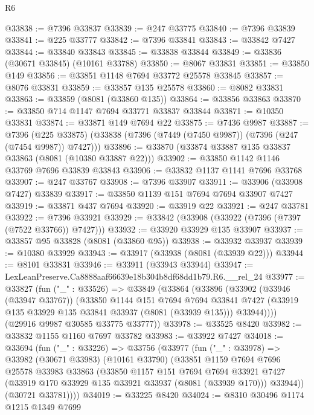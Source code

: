 \begin{lexlean}{R6}
\begin{coremodule}
@33838 := @7396 @33837
@33839 := @247 @33775
@33840 := @7396 @33839
@33841 := @225 @33777
@33842 := @7396 @33841
@33843 := @33842 @7427
@33844 := @33840 @33843
@33845 := @33838 @33844
@33849 := @33836 (@30671 @33845) (@10161 @33788)
@33850 := @8067 @33831
@33851 := @33850 @149
@33856 := @33851 @1148 @7694 @33772 @25578 @33845
@33857 := @8076 @33831
@33859 := @33857 @135 @25578
@33860 := @8082 @33831
@33863 := @33859 (@8081 (@33860 @135))
@33864 := @33856 @33863
@33870 := @33850 @714 @1147 @7694 @33771 @33837 @33844
@33871 := @10350 @33831
@33874 := @33871 @149 @7694 @22
@33875 := @7436 @9987
@33887 := @7396
    (@225 @33875)
    (@33838 (@7396 (@7449 (@7450 @9987)) (@7396 (@247 (@7454 @9987)) @7427)))
@33896 := @33870 (@33874 @33887 @135 @33837 @33863 (@8081 (@10380 @33887 @22)))
@33902 := @33850 @1142 @1146 @33769 @7696 @33839 @33843
@33906 := @33832 @1137 @1141 @7696 @33768
@33907 := @247 @33767
@33908 := @7396 @33907
@33911 := @33906 (@33908 @7427) @33839
@33917 := @33850 @1139 @151 @7694 @7694 @33907 @7427
@33919 := @33871 @437 @7694
@33920 := @33919 @22
@33921 := @247 @33781
@33922 := @7396 @33921
@33929 := @33842 (@33908 (@33922 (@7396 (@7397 (@7522 @33766)) @7427)))
@33932 := @33920 @33929 @135 @33907
@33937 := @33857 @95 @33828 (@8081 (@33860 @95))
@33938 := @33932 @33937
@33939 := @10380 @33929
@33943 := @33917 (@33938 (@8081 (@33939 @22)))
@33944 := @8101 @33831
@33946 := @33911 (@33943 @33944)
@33947 := LexLeanPreserve.Ca8888aaf66639e18b304b8df68dd1b79.R6.__rel_24
@33977 := @33827
    (fun ("_" : @33526) =>
    @33849
      (@33864
        (@33896
          (@33902
            (@33946 (@33947 @33767))
            (@33850
              @1144
              @151
              @7694
              @7694
              @33841
              @7427
              (@33919 @135 @33929 @135 @33841 @33937 (@8081 (@33939 @135)))
              @33944))))
      (@29916 @9987 @30585 @33775 @33777))
@33978 := @33525 @8420
@33982 := @33832 @1155 @1160 @7697 @33782
@33983 := @33922 @7427
@34018 := @33694
    (fun ("_" : @33226) =>
    @33756
      (@33977
        (fun ("_" : @33978) =>
        @33982
          (@30671 @33983)
          (@10161 @33790)
          (@33851
            @1159
            @7694
            @7696
            @25578
            @33983
            @33863
            (@33850
              @1157
              @151
              @7694
              @7694
              @33921
              @7427
              (@33919 @170 @33929 @135 @33921 @33937 (@8081 (@33939 @170)))
              @33944))
          (@30721 @33781))))
@34019 := @33225 @8420
@34024 := @8310 @30496 @1174 @1215 @1349 @7699

\end{coremodule}
\end{lexlean}
